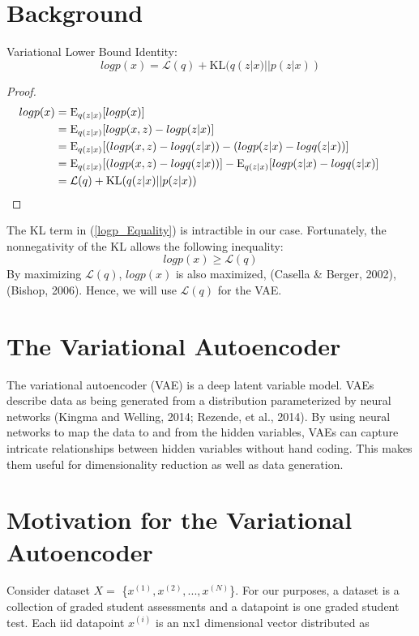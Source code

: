 \documentclass[10pt]{article}
\begin{document}
\section{Background}
Variational Lower Bound Identity:
\begin{equation}\label{logp_Equality}
logp(x) = \mathcal{L}(q) + \mathrm{KL}(q(z|x)||p(z|x))		
\end{equation}
\begin{proof}
	\begin{align*}
		logp(x) &= \mathrm{E}_{q(z|x)}[logp(x)] \\
		&= \mathrm{E}_{q(z|x)}[logp(x,z) - logp(z|x)]\\
		&= \mathrm{E}_{q(z|x)}[(logp(x,z) - logq(z|x)) - (logp(z|x)- logq(z|x))]\\
		&= \mathrm{E}_{q(z|x)}[(logp(x,z) - logq(z|x))] - \mathrm{E}_{q(z|x)}[logp(z|x)- logq(z|x)]\\
		&= \mathcal{L}(q) + \mathrm{KL}(q(z|x)||p(z|x)) &&\qedhere
	\end{align*}
\end{proof}
The KL term in (\ref{logp_Equality}) is intractible in our case.  Fortunately, the nonnegativity of the KL allows the following inequality: 
\begin{equation} \label{logp_Equality}
logp(x) \ge \mathcal{L}(q) 
\end{equation}
By maximizing $\mathcal{L}(q)$, $logp(x)$ is also maximized, (Casella \& Berger, 2002), (Bishop, 2006).  Hence, we will use $\mathcal{L}(q)$ for the VAE. 



\section{The Variational Autoencoder}
The variational autoencoder (VAE) is a deep latent variable model.  VAEs describe data as being generated from a distribution parameterized by neural networks (Kingma and Welling, 2014; Rezende, et al., 2014). By using neural networks to map the data to and from the hidden variables, VAEs can capture  intricate relationships between hidden variables without hand coding.  This makes them  useful for dimensionality reduction as well as data generation.  \\

\section{Motivation for the Variational Autoencoder}
Consider dataset $X=$ \{${x^{(1)}}, x^{(2)}, ..., x^{(N)}$\}.  For our purposes, a dataset is a collection of graded student assessments and a datapoint is one graded student test.
Each iid datapoint $x^{(i)}$ is an nx1 dimensional vector distributed
as  
\end{document}
